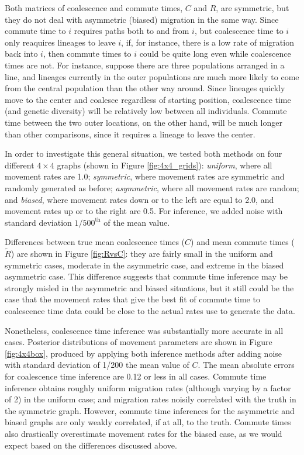 \documentclass{article}
\newcommand{\comdist}{\widetilde{R}}
\begin{document}
Both matrices of coalescence and commute times, $C$ and $R$, are symmetric,
but they do not deal with asymmetric (biased) migration in the same way.
Since commute time to $i$ requires paths both to and from $i$,
but coalescence time to $i$ only reaquires lineages to leave $i$,
if, for instance, there is a low rate of migration back into $i$,
then commute times to $i$ could be quite long even while coalescence times are not.
For instance, suppose there are three populations arranged in a line,
and lineages currently in the outer populations are much more likely to come from the central population
than the other way around.
Since lineages quickly move to the center and coalesce regardless of starting position,
coalescence time (and genetic diversity) will be relatively low between all individuals.
Commute time between the two outer locations, on the other hand,
will be much longer than other comparisons, since it requires a lineage to leave the center.

In order to investigate this general situation,
we tested both methods on four different $4 \times 4$ graphs (shown in Figure \ref{fig:4x4_grids}):
\emph{uniform}, where all movement rates are 1.0;
\emph{symmetric}, where movement rates are symmetric and randomly generated as before;
\emph{asymmetric}, where all movement rates are random;
and \emph{biased}, where movement rates down or to the left are equal to 2.0,
and movement rates up or to the right are 0.5.
For inference, we added noise with standard deviation $1/500^\text{th}$ of the mean value.

Differences between true mean coalescence times ($C$) and mean commute times ($\comdist$) 
are shown in Figure \ref{fig:RvsC}:
they are fairly small in the uniform and symmetric cases, moderate in the asymmetric case, 
and extreme in the biased asymmetric case.
This difference suggests that commute time inference may be strongly misled 
in the asymmetric and biased situations,
but it still could be the case that the movement rates that give the best fit of commute time
to coalescence time data could be close to the actual rates use to generate the data.

Nonetheless, 
coalescence time inference was substantially more accurate in all cases.
Posterior distributions of movement parameters are shown in Figure \ref{fig:4x4box},
produced by applying both inference methods
after adding noise with standard deviation of 1/200 the mean value of $C$.
The mean absolute errors for coalescence time inference are 0.12 or less in all cases.
Commute time inference obtains roughly uniform migration rates
(although varying by a factor of 2) in the uniform case;
and migration rates noisily correlated with the truth in the symmetric graph.
However, commute time inferences for the asymmetric and biased graphs are only weakly correlated, 
if at all, to the truth.
Commute times also drastically overestimate movement rates for the biased case,
as we would expect based on the differences discussed above.
\end{document}
